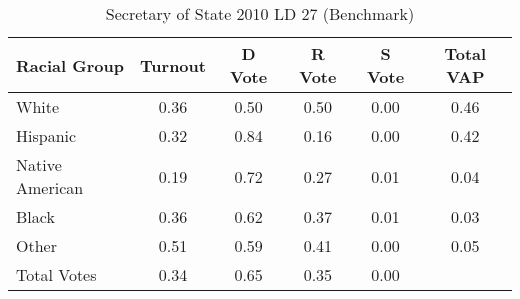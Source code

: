 \begin{table}[htb]
\begin{center}
\caption{Secretary of State 2010 LD 27 (Benchmark)}
\label{sos10_vap_ld_27_benchmark}
\begin{tabular}{lccccc}
  \hline
Racial Group & Turnout & D Vote & R Vote & S Vote & Total VAP \\ 
  \hline
White & 0.36 & 0.50 & 0.50 & 0.00 & 0.46 \\ 
  Hispanic & 0.32 & 0.84 & 0.16 & 0.00 & 0.42 \\ 
  Native American & 0.19 & 0.72 & 0.27 & 0.01 & 0.04 \\ 
  Black & 0.36 & 0.62 & 0.37 & 0.01 & 0.03 \\ 
  Other & 0.51 & 0.59 & 0.41 & 0.00 & 0.05 \\ 
  Total Votes & 0.34 & 0.65 & 0.35 & 0.00 &  \\ 
   \hline
\end{tabular}
\end{center}
\end{table}
